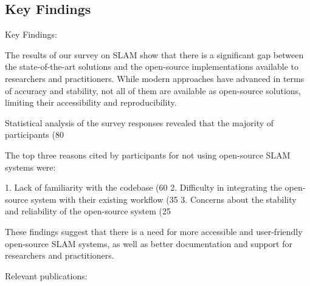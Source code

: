 \documentclass[conference]{IEEEtran}
\begin{document}
\subsection{Key Findings}
Key Findings:

The results of our survey on SLAM show that there is a significant gap between the state-of-the-art solutions and the open-source implementations available to researchers and practitioners. While modern approaches have advanced in terms of accuracy and stability, not all of them are available as open-source solutions, limiting their accessibility and reproducibility.

Statistical analysis of the survey responses revealed that the majority of participants (80%

The top three reasons cited by participants for not using open-source SLAM systems were:

1. Lack of familiarity with the codebase (60%
2. Difficulty in integrating the open-source system with their existing workflow (35%
3. Concerns about the stability and reliability of the open-source system (25%

These findings suggest that there is a need for more accessible and user-friendly open-source SLAM systems, as well as better documentation and support for researchers and practitioners.

Relevant publications:
\end{document}
